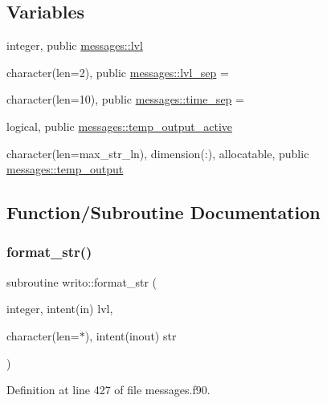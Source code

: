 \subsection*{Variables}
\begin{DoxyCompactItemize}
\item 
integer, public \hyperlink{namespacemessages_a36521a46e57da1d3be83019abdff132e}{messages\+::lvl}
\item 
character(len=2), public \hyperlink{namespacemessages_ab1101c3acf2edc71877d4aa71aa3d931}{messages\+::lvl\+\_\+sep} = \textquotesingle{}\textquotesingle{}
\item 
character(len=10), public \hyperlink{namespacemessages_abeb2abf0ac1d1fb4f09d881eb57b3dae}{messages\+::time\+\_\+sep} = \textquotesingle{}\textquotesingle{}
\item 
logical, public \hyperlink{namespacemessages_ace8877914cfa5253cc002da0f387446a}{messages\+::temp\+\_\+output\+\_\+active}
\item 
character(len=max\+\_\+str\+\_\+ln), dimension(\+:), allocatable, public \hyperlink{namespacemessages_a07070e72f15146af24816c39eea17088}{messages\+::temp\+\_\+output}
\end{DoxyCompactItemize}


\subsection{Function/\+Subroutine Documentation}
\mbox{\label{messages_8f90_a6d15f28783f95a7a4b2a44185619792f}} 
\subsubsection{\texorpdfstring{format\+\_\+str()}{format\_str()}}
{\footnotesize\ttfamily subroutine writo\+::format\+\_\+str (\begin{DoxyParamCaption}\item[{integer, intent(in)}]{lvl,  }\item[{character(len=$\ast$), intent(inout)}]{str }\end{DoxyParamCaption})}



Definition at line 427 of file messages.\+f90.

